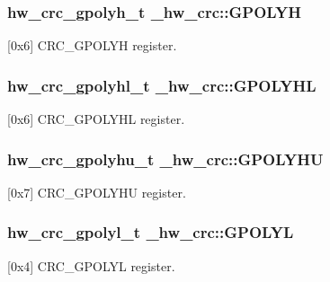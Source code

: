 \subsubsection[{\texorpdfstring{G\+P\+O\+L\+YH}{GPOLYH}}]{ {\bf hw\+\_\+crc\+\_\+gpolyh\+\_\+t} \+\_\+hw\+\_\+crc\+::\+G\+P\+O\+L\+YH}\hypertarget{struct__hw__crc_aef2d1312998852f56ad8bd4eeb74f5ab}{}\label{struct__hw__crc_aef2d1312998852f56ad8bd4eeb74f5ab}
\mbox{[}0x6\mbox{]} C\+R\+C\+\_\+\+G\+P\+O\+L\+YH register. 
\subsubsection[{\texorpdfstring{G\+P\+O\+L\+Y\+HL}{GPOLYHL}}]{ {\bf hw\+\_\+crc\+\_\+gpolyhl\+\_\+t} \+\_\+hw\+\_\+crc\+::\+G\+P\+O\+L\+Y\+HL}\hypertarget{struct__hw__crc_acd050f3ab20b1e1f33d0bc58c5ecce4a}{}\label{struct__hw__crc_acd050f3ab20b1e1f33d0bc58c5ecce4a}
\mbox{[}0x6\mbox{]} C\+R\+C\+\_\+\+G\+P\+O\+L\+Y\+HL register. 
\subsubsection[{\texorpdfstring{G\+P\+O\+L\+Y\+HU}{GPOLYHU}}]{ {\bf hw\+\_\+crc\+\_\+gpolyhu\+\_\+t} \+\_\+hw\+\_\+crc\+::\+G\+P\+O\+L\+Y\+HU}\hypertarget{struct__hw__crc_ab9cf7e22b2ab602b30e8b6863ee031c7}{}\label{struct__hw__crc_ab9cf7e22b2ab602b30e8b6863ee031c7}
\mbox{[}0x7\mbox{]} C\+R\+C\+\_\+\+G\+P\+O\+L\+Y\+HU register. 
\subsubsection[{\texorpdfstring{G\+P\+O\+L\+YL}{GPOLYL}}]{ {\bf hw\+\_\+crc\+\_\+gpolyl\+\_\+t} \+\_\+hw\+\_\+crc\+::\+G\+P\+O\+L\+YL}\hypertarget{struct__hw__crc_a9a6d71806cded662c14d9ffa7cec48e5}{}\label{struct__hw__crc_a9a6d71806cded662c14d9ffa7cec48e5}
\mbox{[}0x4\mbox{]} C\+R\+C\+\_\+\+G\+P\+O\+L\+YL register. 
